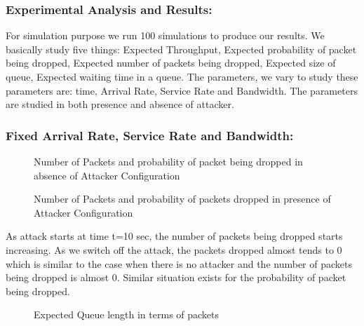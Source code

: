 \subsubsection{Experimental Analysis and Results:}
\medskip

For simulation purpose we run 100 simulations to produce our results. We basically study five things: Expected Throughput, Expected probability of packet being dropped, Expected number of packets being dropped, Expected size of queue, Expected waiting time in a queue. The parameters, we vary to study these parameters are: time, Arrival Rate, Service Rate and Bandwidth. The parameters are studied in both presence and absence of attacker. 
  
\subsubsection*{Fixed Arrival Rate, Service Rate and Bandwidth:}

\begin{figure}[!htb]
	\centering
	\qquad
	\caption{{Number of Packets and probability of packet being dropped in absence of Attacker Configuration}}
	\label{fig:figab}
\end{figure}

\begin{figure}[!htb]
	\centering
	\qquad
	\caption{{Number of Packets and probability of packets dropped in presence of Attacker Configuration}}
	\label{fig:figac}
\end{figure}

As attack starts at time t=10 sec, the number of packets being dropped starts increasing. As we switch off the attack, the packets dropped almost tends to 0 which is similar to the case when there is no attacker and the number of packets being dropped is almost 0. Similar situation exists for the probability of packet being dropped. 

\pagebreak

\begin{figure}[!htb]
	\centering
	\qquad
	\caption{{Expected Queue length in terms of packets}}
	\label{fig:figad}
\end{figure}

